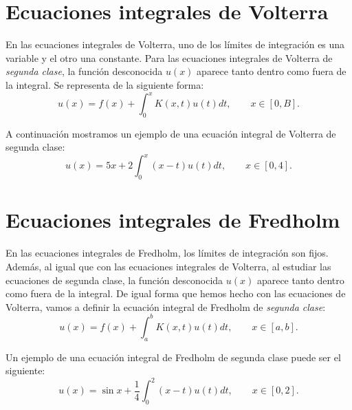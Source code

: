 \section{Ecuaciones integrales de Volterra}
En las ecuaciones integrales de Volterra, uno de los límites de integración es una variable y el otro una constante. Para las ecuaciones integrales de Volterra de \textit{segunda clase}, la función desconocida $u(x)$ aparece tanto dentro como fuera de la integral. Se representa de la siguiente forma:
\begin{equation}\label{eq:volterra}
	u(x) = f(x) + \int_0^x K(x,t)u(t)dt, \qquad x \in [0,B].
\end{equation}
\begin{ejemplo}
	A continuación mostramos un ejemplo de una ecuación integral de Volterra de segunda clase:
	\begin{equation}\label{}
		u(x) = 5x + 2\int_0^x (x-t)u(t)dt, \qquad x \in [0,4].
	\end{equation}	
\end{ejemplo}

\section{Ecuaciones integrales de Fredholm}
En las ecuaciones integrales de Fredholm, los límites de integración son fijos. Además, al igual que con las ecuaciones integrales de Volterra, al estudiar las ecuaciones de segunda clase, la función desconocida $u(x)$ aparece tanto dentro como fuera de la integral. De igual forma que hemos hecho con las ecuaciones de Volterra, vamos a definir la ecuación integral de Fredholm de \textit{segunda clase}:
\begin{equation}\label{}
	u(x) = f(x) + \int_a^b K(x,t)u(t)dt, \qquad x \in [a,b].
\end{equation}
\begin{ejemplo}
	Un ejemplo de una ecuación integral de Fredholm de segunda clase puede ser el siguiente:
	\begin{equation}\label{}
		u(x) = \sin x + \dfrac{1}{4}\int_{0}^2 (x-t)u(t)dt, \qquad x \in [0,2].
	\end{equation}
\end{ejemplo}
